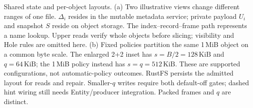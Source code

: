 \caption{Shared state and per-object layouts.
(a) Two illustrative views change different ranges of one file.
$\Delta_i$ resides in the mutable metadata service; private payload $U_i$ and
snapshot $S$ reside on object storage. The index--record--frame path represents
a name lookup. Upper reads verify whole objects before slicing; visibility and
Hole rules are omitted here.
(b) Fixed policies partition the same 1\,MiB object on a common byte scale.
The enlarged 2+2 inset has $s=B/2=128\,\mathrm{KiB}$ and $q=64\,\mathrm{KiB}$;
the 1\,MiB policy instead has $s=q=512\,\mathrm{KiB}$.
These are supported configurations, not automatic-policy outcomes.
RustFS persists the admitted layout for reads and repair. Smaller-$q$ writes
require both default-off gates; dashed hint wiring still needs Entity/producer
integration. Packed frames and $q$ are distinct.}
